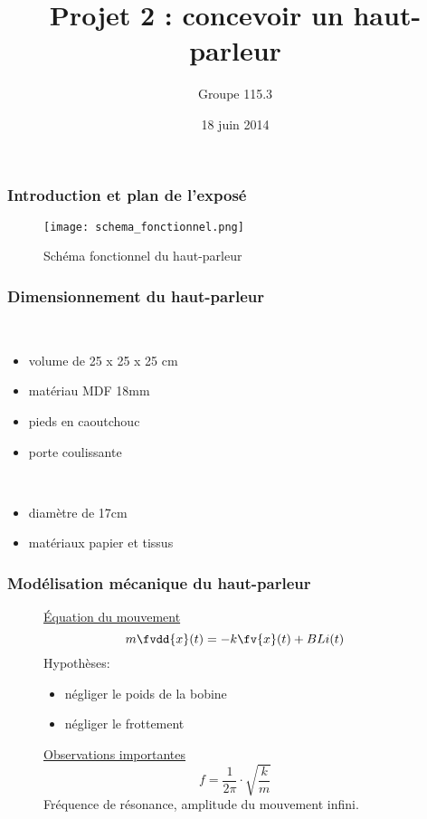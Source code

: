 \documentclass[pdf]{beamer}
\title{Projet 2 : concevoir un haut-parleur}
\author{Groupe 115.3}
\date{18 juin 2014}
\begin{document}
\begin{frame}
\titlepage
\end{frame}



\begin{frame}
\frametitle{Introduction et plan de l'exposé}
\begin{figure}[ht!]
    \centering
    \texttt{[image: schema\_fonctionnel.png]}
    \caption{Schéma fonctionnel du haut-parleur}
    \label{schema_fonctionnel}
\end{figure}
\end{frame}


\begin{frame}
\frametitle{Dimensionnement du haut-parleur}
 \\
\begin{itemize}
\item volume de 25 x 25 x 25 cm
\item matériau MDF 18mm
\item pieds en caoutchouc
\item porte coulissante
\end{itemize}
 \\
\begin{itemize}
\item diamètre de 17cm
\item matériaux papier et tissus
\end{itemize}
\end{frame}


\begin{frame}
\frametitle{Modélisation mécanique du haut-parleur}
\begin{figure}[ht]
\underline{Équation du mouvement}
$$m\fvdd{x}(t) = -k\fv{x}(t) + BLi(t)$$
Hypothèses: 
\begin{itemize}
\item négliger le poids de la bobine
\item négliger le frottement
\end{itemize}
\endminipage\hfill
{}
\underline{Observations importantes}
$$f= \frac{1}{2\pi} \cdot{\sqrt{\frac{k}{m}}}$$
Fréquence de résonance, amplitude du mouvement infini.
\endminipage\hfill
\end{figure}
\end{frame}

\end{document}
